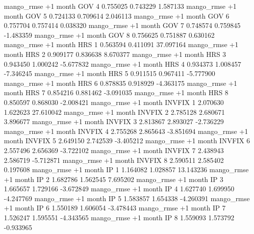 mango_rmse  +1 month      GOV                 4 0.755025       0.743229           1.587133
mango_rmse  +1 month      GOV                 5 0.724133       0.709614           2.046113
mango_rmse  +1 month      GOV                 6 0.757704       0.757414           0.038320
mango_rmse  +1 month      GOV                 7 0.748574       0.759845          -1.483359
mango_rmse  +1 month      GOV                 8 0.756625       0.751887           0.630162
mango_rmse  +1 month      HRS                 1 0.563594       0.411091          37.097164
mango_rmse  +1 month      HRS                 2 0.909177       0.836638           8.670377
mango_rmse  +1 month      HRS                 3 0.943450       1.000242          -5.677832
mango_rmse  +1 month      HRS                 4 0.934373       1.008457          -7.346245
mango_rmse  +1 month      HRS                 5 0.911515       0.967411          -5.777900
mango_rmse  +1 month      HRS                 6 0.878835       0.918929          -4.363175
mango_rmse  +1 month      HRS                 7 0.854216       0.881462          -3.091035
mango_rmse  +1 month      HRS                 8 0.850597       0.868030          -2.008421
mango_rmse  +1 month   INVFIX                 1 2.070630       1.622623          27.610042
mango_rmse  +1 month   INVFIX                 2 2.785128       2.680671           3.896677
mango_rmse  +1 month   INVFIX                 3 2.813867       2.893027          -2.736229
mango_rmse  +1 month   INVFIX                 4 2.755268       2.865643          -3.851694
mango_rmse  +1 month   INVFIX                 5 2.649150       2.742539          -3.405212
mango_rmse  +1 month   INVFIX                 6 2.557496       2.656369          -3.722102
mango_rmse  +1 month   INVFIX                 7 2.438943       2.586719          -5.712871
mango_rmse  +1 month   INVFIX                 8 2.590511       2.585402           0.197608
mango_rmse  +1 month       IP                 1 1.164082       1.028857          13.143236
mango_rmse  +1 month       IP                 2 1.682786       1.562545           7.695202
mango_rmse  +1 month       IP                 3 1.665657       1.729166          -3.672849
mango_rmse  +1 month       IP                 4 1.627740       1.699950          -4.247769
mango_rmse  +1 month       IP                 5 1.583857       1.654338          -4.260391
mango_rmse  +1 month       IP                 6 1.550189       1.606054          -3.478443
mango_rmse  +1 month       IP                 7 1.526247       1.595551          -4.343565
mango_rmse  +1 month       IP                 8 1.559093       1.573792          -0.933965

